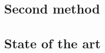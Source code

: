 \begin{fullwidth}
\part[SECOND METHOD]{Second method}

\chapter[STATE OF THE ART]{State of the art}
\label{chap:sota2}
\end{fullwidth}

